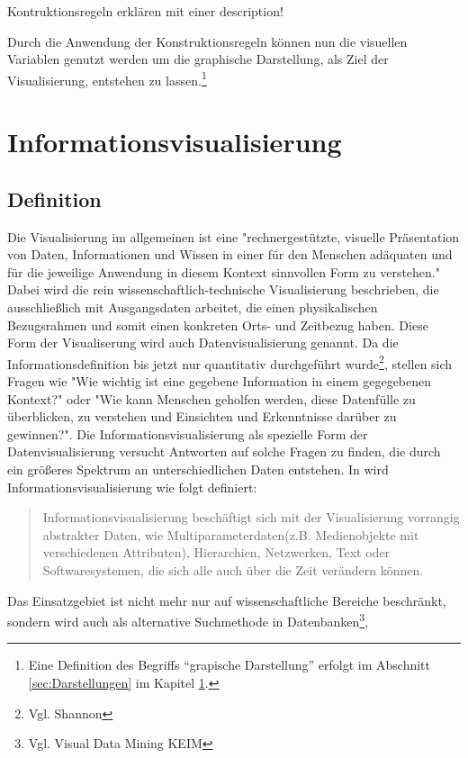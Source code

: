 \documentclass[a4paper, 12pt, DIVcalc, onepage, pdftex, headsepline, footsepline]{scrreprt}
\begin{document}
Kontruktionsregeln erklären mit einer description!

Durch die Anwendung der Konstruktionsregeln können nun die visuellen Variablen genutzt werden um
die graphische Darstellung, als Ziel der Visualisierung, entstehen zu lassen.\footnote{Eine Definition
des Begriffs "`grapische Darstellung"' erfolgt im Abschnitt \ref{sec:Darstellungen} im Kapitel
\ref{cha:Informationsvisualisierung}.}

\chapter{Informationsvisualisierung}
\label{cha:Informationsvisualisierung}
\section{Definition}
\label{sec:Definition}
Die Visualisierung im allgemeinen ist eine "rechnergestützte, visuelle Präsentation von Daten, Informationen und Wissen
in einer für den Menschen adäquaten und für die jeweilige Anwendung in diesem Kontext sinnvollen Form
zu verstehen."\citep[S.\,3]{Schumann}
Dabei wird die rein wissenschaftlich-technische Visualisierung beschrieben, die ausschließlich mit Ausgangsdaten arbeitet,
die einen physikalischen Bezugsrahmen und somit einen konkreten Orts- und Zeitbezug haben. Diese Form der
Visualiserung wird auch Datenvisualisierung genannt.
Da die Informationsdefinition bis jetzt nur quantitativ durchgeführt wurde\footnote{Vgl. Shannon}, stellen sich 
Fragen wie "Wie wichtig ist eine gegebene Information in einem gegegebenen Kontext?"\citep[S.\,341]{Schumann}
oder "Wie kann Menschen geholfen werden, diese Datenfülle zu überblicken, zu verstehen und Einsichten und Erkenntnisse
darüber zu gewinnen?"\citep[S.\,435]{Preim}.
Die Informationsvisualisierung als spezielle Form der Datenvisualisierung versucht Antworten auf solche
Fragen zu finden, die durch ein größeres Spektrum an unterschiedlichen Daten entstehen.
In \citep[S.\,434]{Preim} wird Informationsvisualisierung wie folgt definiert:
\begin{quote}
Informationsvisualisierung beschäftigt sich mit der Visualisierung vorrangig abstrakter Daten, wie
Multiparameterdaten(z.B. Medienobjekte mit verschiedenen Attributen), Hierarchien, Netzwerken, Text
oder Softwaresystemen, die sich alle auch über die Zeit verändern können.
\end{quote}
Das Einsatzgebiet ist nicht mehr nur auf wissenschaftliche Bereiche beschränkt,
sondern wird auch als alternative Suchmethode in Datenbanken\footnote{Vgl. Visual Data Mining KEIM},
\end{document}
